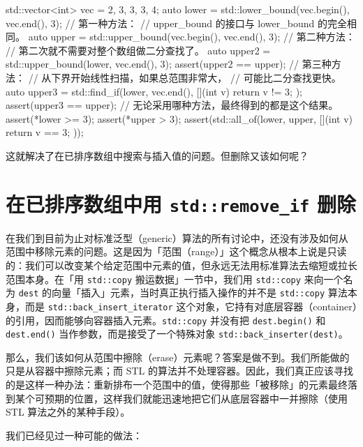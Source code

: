 \begin{codebox}[cpp]
    std::vector<int> vec = {2, 3, 3, 3, 4};
    auto lower = std::lower_bound(vec.begin(), vec.end(), 3);
    // 第一种方法：
    // upper_bound 的接口与 lower_bound 的完全相同。
    auto upper = std::upper_bound(vec.begin(), vec.end(), 3);
    // 第二种方法：
    // 第二次就不需要对整个数组做二分查找了。
    auto upper2 = std::upper_bound(lower, vec.end(), 3);
    assert(upper2 == upper);
    // 第三种方法：
    // 从下界开始线性扫描，如果总范围非常大，
    // 可能比二分查找更快。
    auto upper3 = std::find_if(lower, vec.end(), [](int v) {
      return v != 3;
    });
    assert(upper3 == upper);
    // 无论采用哪种方法，最终得到的都是这个结果。
    assert(*lower >= 3);
    assert(*upper > 3);
    assert(std::all_of(lower, upper, [](int v) { return v == 3; }));
\end{codebox}

这就解决了在已排序数组中搜索与插入值的问题。但删除又该如何呢？

\section{在已排序数组中用 \texttt{std::\allowbreak{}remove\_\allowbreak{}if} 删除}

在我们到目前为止对标准泛型（generic）算法的所有讨论中，还没有涉及如何从范围中移除元素的问题。这是因为「范围（range）」这个概念从根本上说是只读的：我们可以改变某个给定范围中元素的值，但永远无法用标准算法去缩短或拉长范围本身。在「用 \texttt{std::\allowbreak{}copy} 搬运数据」一节中，我们用 \texttt{std::\allowbreak{}copy} 来向一个名为 \texttt{dest} 的向量「插入」元素，当时真正执行插入操作的并不是 \texttt{std::\allowbreak{}copy} 算法本身，而是 \texttt{std::\allowbreak{}back\_\allowbreak{}insert\_\allowbreak{}iterator} 这个对象，它持有对底层容器（container）的引用，因而能够向容器插入元素。\texttt{std::\allowbreak{}copy} 并没有把 \texttt{dest.\allowbreak{}begin(\allowbreak{})\allowbreak{}} 和 \texttt{dest.\allowbreak{}end(\allowbreak{})\allowbreak{}} 当作参数，而是接受了一个特殊对象 \texttt{std::\allowbreak{}back\_\allowbreak{}inserter(\allowbreak{}dest)\allowbreak{}}。

那么，我们该如何从范围中擦除（erase）元素呢？答案是做不到。我们所能做的只是从容器中擦除元素；而 STL 的算法并不处理容器。因此，我们真正应该寻找的是这样一种办法：重新排布一个范围中的值，使得那些「被移除」的元素最终落到某个可预期的位置，这样我们就能迅速地把它们从底层容器中一并擦除（使用 STL 算法之外的某种手段）。

我们已经见过一种可能的做法：

